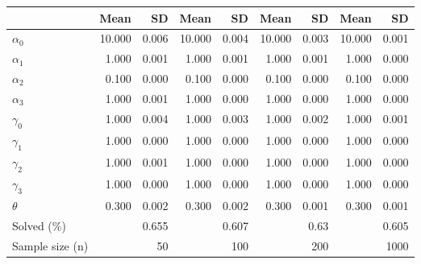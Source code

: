 
\begin{tabular}[t]{lrrrrrrrr}
\toprule
  & Mean & SD & Mean  & SD  & Mean   & SD   & Mean    & SD   \\
\midrule
$\alpha_{0}$ & 10.000 & 0.006 & 10.000 & 0.004 & 10.000 & 0.003 & 10.000 & 0.001\\
$\alpha_{1}$ & 1.000 & 0.001 & 1.000 & 0.001 & 1.000 & 0.001 & 1.000 & 0.000\\
$\alpha_{2}$ & 0.100 & 0.000 & 0.100 & 0.000 & 0.100 & 0.000 & 0.100 & 0.000\\
$\alpha_{3}$ & 1.000 & 0.001 & 1.000 & 0.000 & 1.000 & 0.000 & 1.000 & 0.000\\
$\gamma_{0}$ & 1.000 & 0.004 & 1.000 & 0.003 & 1.000 & 0.002 & 1.000 & 0.001\\
$\gamma_{1}$ & 1.000 & 0.000 & 1.000 & 0.000 & 1.000 & 0.000 & 1.000 & 0.000\\
$\gamma_{2}$ & 1.000 & 0.001 & 1.000 & 0.000 & 1.000 & 0.000 & 1.000 & 0.000\\
$\gamma_{3}$ & 1.000 & 0.000 & 1.000 & 0.000 & 1.000 & 0.000 & 1.000 & 0.000\\
$\theta$ & 0.300 & 0.002 & 0.300 & 0.002 & 0.300 & 0.001 & 0.300 & 0.001\\
Solved (\%) &  & 0.655 &  & 0.607 &  & 0.63 &  & 0.605\\
Sample size (n) &  & 50 &  & 100 &  & 200 &  & 1000\\
\bottomrule
\end{tabular}

